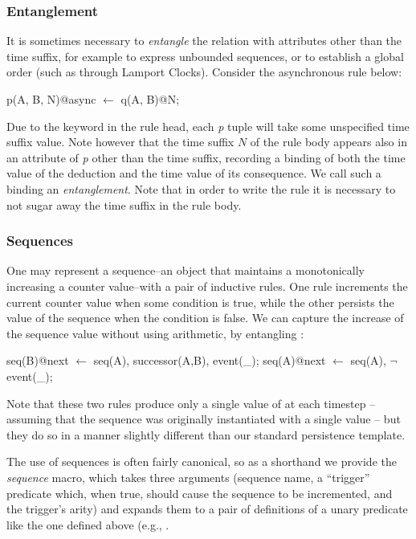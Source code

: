 
\subsubsection{Entanglement}
\label{sec:entangle}
It is sometimes necessary to {\em entangle} the  relation with attributes
other than the time suffix, for example to express unbounded sequences, or to establish
a global order (such as through Lamport Clocks).  Consider the asynchronous rule below:

\begin{Dedalus}
p(A, B, N)@async \(\leftarrow\)
  q(A, B)@N;
\end{Dedalus}
\noindent

Due to the  keyword in the rule head, each \emph{p} tuple will take some unspecified time suffix value.
Note however that the time suffix $N$ of the rule body appears also in an attribute of \emph{p} other than the time suffix, recording a 
binding of both the time value of the deduction and the time value of its consequence.  We call such a binding
an \emph{entanglement}.   Note that in order
to write the rule it is necessary to not sugar away the time suffix in the rule body.  

\subsubsection{Sequences}
One may represent a sequence--an object that maintains a monotonically increasing a counter value--with a pair of inductive rules.  One rule increments the current counter value when some condition is 
true, while the other persists the value of the sequence when the condition is false.  We can capture the increase
of the sequence value without using arithmetic, by entangling :

\begin{Dedalus}
seq(B)@next \(\leftarrow\) seq(A), successor(A,B), event(_);  
seq(A)@next \(\leftarrow\) seq(A), \(\lnot\)event(_);
\end{Dedalus}

\noindent
Note that these two rules produce only a single value of  at each timestep -- assuming that the sequence was originally instantiated with a single value -- but they do so in a manner slightly different than our standard persistence template.

The use of sequences is often fairly canonical, so as a shorthand we provide the {\em sequence}
macro, which takes three arguments (sequence name, a ``trigger'' predicate which, when true, 
should cause the sequence to be incremented, and the trigger's arity) and expands them to a pair 
of definitions of a unary predicate like the one defined above (e.g., .

